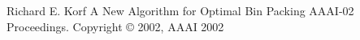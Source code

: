 \documentclass[11pt]{article}
\theoremstyle{definition}
\begin{document}
\begin{lstlisting}
\end{lstlisting}


\begin{thebibliography}{9}
	Richard E. Korf
	A New Algorithm for Optimal Bin Packing
	AAAI-02 Proceedings. Copyright © 2002, AAAI
	2002

\end{thebibliography}
\end{document}
